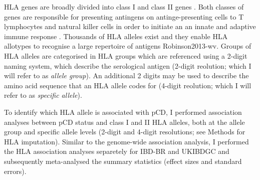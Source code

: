 HLA genes are broadly divided into class I and class II genes \cite{Marsh2010-mq}. Both classes of genes are responsible for presenting antingens on antinge-presenting cells to T lymphocytes and natural killer cells in order to initiate an an innate and adaptive immune response \cite{Shiina2009-wt}. Thousands of HLA alleles exist and they enable HLA allotypes to recognise a large repertoire of antigens {Robinson2013-wv}. Groups of HLA alleles are categorised in HLA groups which are referenced using a 2-digit naming system, which describe the serological antigen \cite{hla-nomenclature} (2-digit reolution; which I will refer to as \textit{allele group}). An additional 2 digits may be used to describe the amino acid sequence that an HLA allele codes for \cite{hla-nomenclature-4digit} (4-digit reolution; which I will refer to as \textit{specific allele}). 

To identify which HLA allele is associated with pCD, I performed association analyses between pCD status and class I and II HLA alleles, both at the allele group and specific allele levels (2-digit and 4-digit resolutions; see Methods for HLA imputation). Similar to the genome-wide association analysis, I performed the HLA association analyses separetely for IBD-BR and UKIBDGC and subsequently meta-analysed the summary statistics (effect sizes and standard errors). \\

